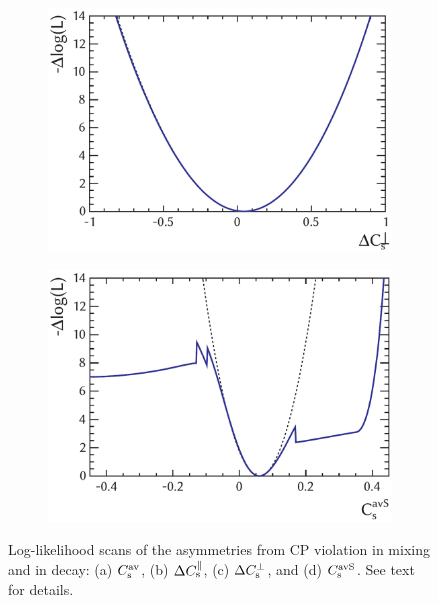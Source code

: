 \begin{figure}[tbp]
  \vspace*{0.02\textwidth}
  \begin{subfigure}{0.49\textwidth}
    \includegraphics[width=\textwidth]{graphics/results/NLL_polarDep_CCPRel_Aperp}
    \caption{}
  \end{subfigure}
  \hfill%
  \begin{subfigure}{0.49\textwidth}
    \includegraphics[width=\textwidth]{graphics/results/NLL_polarDep_CCPAv_AS}
    \caption{}
  \end{subfigure}

  \caption{Log-likelihood scans of the asymmetries from CP violation in mixing and in decay:
           (a) $C_\text{s}^\text{av}$, (b) $\Delta C_\text{s}^\parallel$, (c) $\Delta C_\text{s}^\perp$, and (d) $C_\text{s}^\text{avS}$.
           See text for details.}
  \label{fig:NLL_CPV_mixDecay}
\end{figure}

